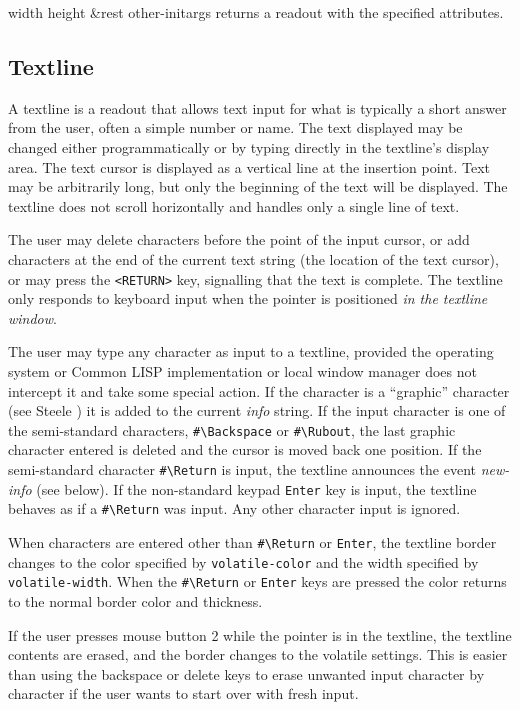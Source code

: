 \documentclass[twoside,openright,11pt]{report}
\newcommand{\tp}[1]{\texttt{#1}}
\begin{document}

{width height \&rest other-initargs}
{returns a readout with the specified attributes.}

\subsection{Textline} \label{sec:textlines}

A textline is a readout that allows text input for what is typically a
short answer from the user, often a simple number or name.  The text
displayed may be changed either programmatically or by typing directly
in the textline's display area.  The text cursor is displayed as a
vertical line at the insertion point.  Text may be arbitrarily long,
but only the beginning of the text will be displayed.  The textline
does not scroll horizontally and handles only a single line of text.

The user may delete characters before the point of the input cursor,
or add characters at the end of the current text string (the location
of the text cursor), or may press the \tp{<RETURN>} key, signalling
that the text is complete.  The textline only responds to keyboard
input when the pointer is positioned \emph{in the textline window}.

The user may type any character as input to a textline, provided the
operating system or Common LISP implementation or local window manager
does not intercept it and take some special action.  If the character
is a ``graphic'' character (see Steele \cite[page 376]{steele90}) it
is added to the current \emph{info} string.  If the input character is
one of the semi-standard characters, \verb|#\Backspace| or
\verb|#\Rubout|, the last graphic character entered is deleted and the
cursor is moved back one position.  If the semi-standard character
\verb|#\Return| is input, the textline announces the event
\emph{new-info} (see below).  If the non-standard keypad \tp{Enter}
key is input, the textline behaves as if a \verb|#\Return| was input.
Any other character input is ignored.

When characters are entered other than \verb|#\Return| or \tp{Enter},
the textline border changes to the color specified by
\tp{volatile-color} and the width specified by \tp{volatile-width}.
When the \verb|#\Return| or \tp{Enter} keys are pressed the color
returns to the normal border color and thickness.

If the user presses mouse button 2 while the pointer is in the
textline, the textline contents are erased, and the border changes to
the volatile settings.  This is easier than using the backspace or
delete keys to erase unwanted input character by character if the user
wants to start over with fresh input.
\end{document}
